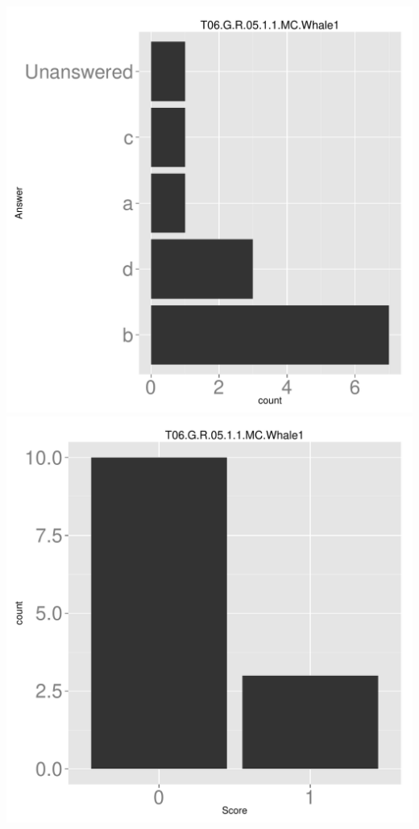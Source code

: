 \documentclass[12pt,english,nohyper]{tufte-handout}\usepackage[]{graphicx}\usepackage[]{color}
\begin{document}
\begin{center} \includegraphics[width=.45\linewidth]{Topic06_AB_73_answer} \includegraphics[width=.45\linewidth]{Topic06_AB_73_score} \end{center} 
\end{document}
